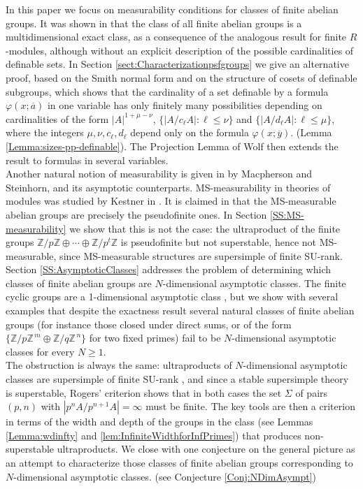 \documentclass[10pt,a4paper]{amsart}
\theoremstyle{definition}
\newcommand{\ov}[1]{\overline{#1}}
\begin{document}
In this paper we focus on measurability conditions for classes of finite
abelian groups. It was shown in \cite{AMSW} that the class of all finite
abelian groups is a multidimensional exact class, as a consequence of the
analogous result for finite $R$-modules, although without an explicit
description of the possible cardinalities of definable sets. In
Section \ref{sect:Characterizationpsfgroups} we give an alternative proof, based on the Smith normal form and on
the structure of cosets of definable subgroups, which shows that the cardinality of a set definable by a formula $\varphi(x;\ov{a})$ in one variable has only finitely many possibilities depending on cardinalities of the form $|A|^{1+\mu-\nu}$, $\{|A/c_\ell A|:\ell\leq\nu\}$ and $\{|A/d_\ell A|:\ell\leq\mu\}$, where the integers $\mu,\nu,c_\ell,d_\ell$
depend only on the formula $\varphi(x;\ov{y})$. (Lemma \ref{Lemma:sizes-pp-definable}). The Projection Lemma of Wolf then extends the result to formulas in
several variables.\\

Another natural notion of measurability is given in \cite{Macpherson-Steinhorn} by 
Macpherson and Steinhorn, and its asymptotic counterparts. MS-measurability in theories of modules was studied by Kestner in \cite{Kestner2014}. It is claimed in 
\cite[Remark 4.14]{Kestner2014} that the MS-measurable abelian groups are
precisely the pseudofinite ones. In Section \ref{SS:MS-measurability} we show that this is not
the case: the ultraproduct of the finite groups
$\mathbb{Z}/p\mathbb{Z}\oplus\cdots\oplus\mathbb{Z}/p^t\mathbb{Z}$ is
pseudofinite but not superstable, hence not MS-measurable, since
MS-measurable structures are supersimple of finite SU-rank. \\

Section \ref{SS:AsymptoticClasses} addresses the problem of determining which classes of finite
abelian groups are $N$-dimensional asymptotic classes. The finite cyclic
groups are a 1-dimensional asymptotic class \cite[Theorem 3.14]{Macpherson-Steinhorn}, but we show with several examples that despite the exactness result several natural
classes of finite abelian groups (for instance those closed under direct
sums, or of the form $\{\mathbb{Z}/p\mathbb{Z}^{\,m}\oplus
\mathbb{Z}/q\mathbb{Z}^{\,n}\}$ for two fixed primes) fail to be
$N$-dimensional asymptotic classes for every $N\ge1$.\\

The obstruction is always the same: ultraproducts of $N$-dimensional
asymptotic classes are supersimple of finite SU-rank \cite{Elwes-AsymptoticClasses}, and since a stable supersimple
theory is superstable, Rogers' criterion shows
that in both cases the set $\Sigma$ of pairs $(p,n)$ with
$|p^nA/p^{n+1}A|=\infty$ must be finite. The key tools are then a criterion
in terms of the width and depth of the groups in the class
(see Lemmas \ref{Lemma:wdinfty} and \ref{lem:InfiniteWidthforInfPrimes}) that produces
non-superstable ultraproducts. We close with one conjecture on the general picture as an attempt to characterize those classes of finite abelian groups corresponding to $N$-dimensional asymptotic classes. (see Conjecture \ref{Conj:NDimAsympt})\\
\end{document}
